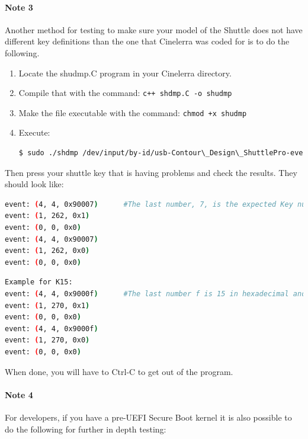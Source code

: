 \paragraph{Note 3}
Another method for testing to make sure your model of the Shuttle does not have different key definitions than the one that Cinelerra was coded for is to do the following.

\begin{enumerate}
    \item Locate the shudmp.C program in your Cinelerra directory.
    \item Compile that with the command:  \texttt{c++ shdmp.C -o shudmp}
    \item Make the file executable with the command:  \texttt{chmod +x shudmp}
    \item Execute:
    \begin{lstlisting}[language=Bash,numbers=none]
$ sudo ./shdmp /dev/input/by-id/usb-Contour\_Design\_ShuttlePro-event-if00 # substitute your shuttle
    \end{lstlisting}
\end{enumerate}

\noindent Then press your shuttle key that is having problems and check the results.  They should look like:

\begin{lstlisting}[language=Bash,numbers=none,caption={Example for K7}]
event: (4, 4, 0x90007)		#The last number, 7, is the expected Key number. 
event: (1, 262, 0x1) 
event: (0, 0, 0x0) 
event: (4, 4, 0x90007) 
event: (1, 262, 0x0) 
event: (0, 0, 0x0) 
\end{lstlisting}

\begin{lstlisting}[language=Bash,numbers=none,caption={Example for K15}]
Example for K15: 
event: (4, 4, 0x9000f)		#The last number f is 15 in hexadecimal and is the expected Key. 
event: (1, 270, 0x1) 
event: (0, 0, 0x0) 
event: (4, 4, 0x9000f) 
event: (1, 270, 0x0) 
event: (0, 0, 0x0)
\end{lstlisting}

\noindent When done, you will have to Ctrl-C to get out of the program.

\paragraph{Note 4} For developers, if you have a pre-UEFI Secure Boot kernel it is also possible to do the following for further in depth testing:

